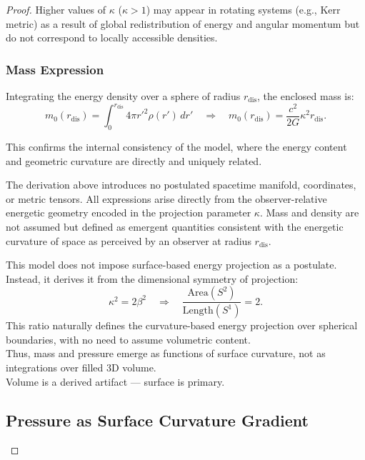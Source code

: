 \documentclass{article}
\begin{document}
\begin{theorem}
\begin{proof}
Higher values of $\kappa$ (\(\kappa > 1\)) may appear in rotating systems (e.g., Kerr metric) as a result of global redistribution of energy and angular momentum but do not correspond to locally accessible densities.

\subsubsection{Mass Expression}

Integrating the energy density over a sphere of radius $r_{\text{dis}}$, the enclosed mass is:
\[
m_0(r_{\text{dis}}) = \int_0^{r_{\text{dis}}} 4\pi r'^2 \rho(r') \, d r' 
\quad \Longrightarrow \quad m_0(r_{\text{dis}}) = \frac{c^2}{2G} \kappa^2 r_{\text{dis}}.
\]

This confirms the internal consistency of the model, where the energy content and geometric curvature are directly and uniquely related.

\begin{tcolorbox}[colback=gray!5,colframe=black!40!black,title=Epistemological Note]
The derivation above introduces no postulated spacetime manifold, coordinates, or metric tensors. All expressions arise directly from the observer-relative energetic geometry encoded in the projection parameter $\kappa$. Mass and density are not assumed but defined as emergent quantities consistent with the energetic curvature of space as perceived by an observer at radius $r_{\text{dis}}$.
\end{tcolorbox}



\begin{tcolorbox}[colback=gray!4, colframe=black!80!black, title=Foundational Clarification]
This model does not impose surface-based energy projection as a postulate.\\
Instead, it derives it from the dimensional symmetry of projection:
\[
\boxed{\kappa^2 = 2 \beta^2}
\quad \Rightarrow \quad
\frac{\text{Area}(S^2)}{\text{Length}(S^1)} = 2.
\]
This ratio naturally defines the curvature-based energy projection over spherical boundaries, with no need to assume volumetric content.\\

Thus, mass and pressure emerge as functions of surface curvature, not as integrations over filled 3D volume.\\
Volume is a derived artifact — surface is primary.
\end{tcolorbox}

\subsection{Pressure as Surface Curvature Gradient}


\end{proof}
\end{theorem}
\end{document}
